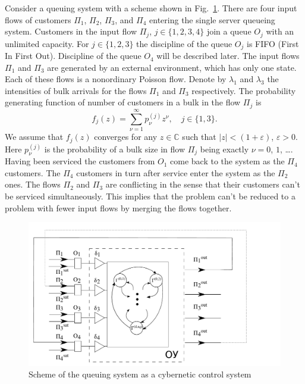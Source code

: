\documentclass[60x84/16,10pt]{dccn}
\begin{document}
{Consider a queuing system with a scheme shown in Fig.~\ref{SystemScheme}.  There are four
input flows of customers $\Pi_1$, $\Pi_2$, $\Pi_3$, and $\Pi_4$ entering the single server queueing
system. Customers in the input flow $\Pi_j$, $j \in \{1,2,3,4\}$ join a queue $O_j$ with an
unlimited capacity. For $j \in \{1,2,3\}$ the discipline of the queue $O_j$ is FIFO (First In First
Out). Discipline of the queue $O_4$ will be described later. The input flows $\Pi_1$ and $\Pi_3$ are
generated by an external environment, which has only one state. Each of these flows is a nonordinary
Poisson flow. Denote by $\lambda_1$ and $\lambda_3$ the intensities of bulk arrivals for the flows
$\Pi_1$ and $\Pi_3$ respectively. The probability generating function of number of customers in a
bulk in the flow $\Pi_j$ is
\begin{equation}
f_j(z) = \sum_{\nu=1}^{\infty} p_{\nu}^{(j)} z ^{\nu}, \quad j\in \{1,3\}.
\label{GeneratingFunc}
\end{equation}
We assume that $f_j(z)$ converges for any $z\in \mathbb{C}$ such that $|z|<(1+\varepsilon)$,
$\varepsilon>0$. Here $p_{\nu}^{(j)}$ is the probability of a bulk size in flow $\Pi_j$ being
exactly $\nu=0$, $1$, \ldots. Having been serviced the customers from $O_1$ come back to the system
as the $\Pi_4$ customers. The $\Pi_4$ customers in turn after service enter the system as the
$\Pi_2$ ones. The flows $\Pi_2$ and $\Pi_3$ are conflicting in the sense that their customers can't
be serviced simultaneously. This implies that the problem can't be reduced to a problem with fewer
input flows by merging the flows together.
\begin{figure}[h!]
   \centering
    \includegraphics[width=\textwidth]{SystemScheme.pdf} %
    \caption {Scheme of the queuing system as a cybernetic control system}
    \label{SystemScheme}
\end{figure}

}
\end{document}
